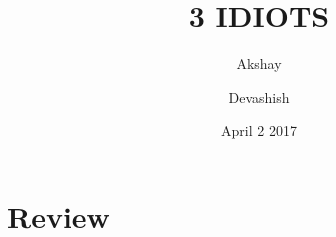\documentclass{article}
\title{3 IDIOTS}
\author{Akshay}
\author{Devashish}
\date{April 2 2017}
\begin{document}
\maketitle
\section{Review}
\end{document}
